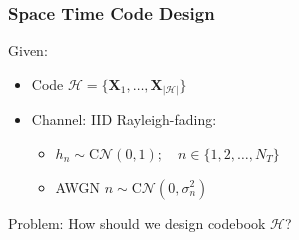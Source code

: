 \documentclass[a4paper, 10pt]{article}
\begin{document}
\subsubsection*{Space Time Code Design}
Given: 
\begin{itemize}
	\item Code  $\mathscr{H} = \bigl\{\textbf{X}_1,\dots ,\textbf{X}_{|\mathscr{H}|}\bigr\}$
	\item Channel: IID Rayleigh-fading: 
	\begin{itemize}
		\item $h_n \sim \text{C}\mathcal{N}(0,1);\quad n \in \{1, 2, \dots , N_T \} $
		\item AWGN $ n \sim \text{C}\mathcal{N}(0,\sigma _n^2) $
	\end{itemize}
\end{itemize}
Problem: How should we design codebook $\mathscr{H}$?
\end{document}
